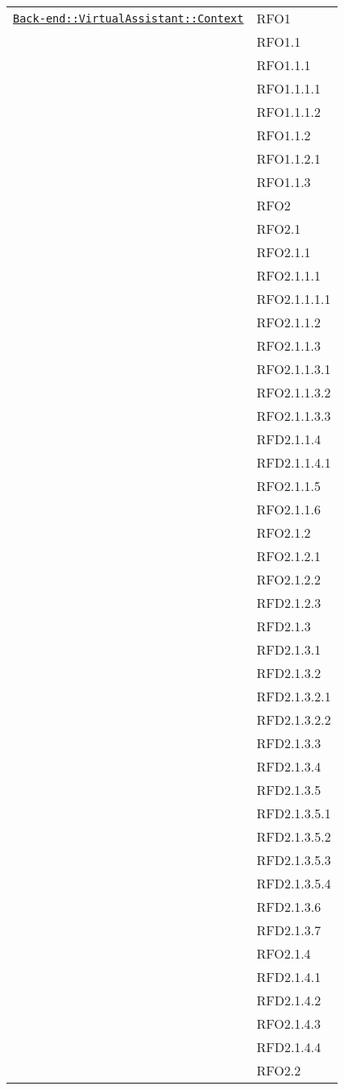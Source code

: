 \begin{longtable}{|>{\centering}m{10cm}|m{3cm}<{\centering}|}
\hyperref[Back-end::VirtualAssistant::Context]{\texttt{Back-end::VirtualAssistant::Context}} & RFO1\\
& RFO1.1\\
& RFO1.1.1\\
& RFO1.1.1.1\\
& RFO1.1.1.2\\
& RFO1.1.2\\
& RFO1.1.2.1\\
& RFO1.1.3\\
& RFO2\\
& RFO2.1\\
& RFO2.1.1\\
& RFO2.1.1.1\\
& RFO2.1.1.1.1\\
& RFO2.1.1.2\\
& RFO2.1.1.3\\
& RFO2.1.1.3.1\\
& RFO2.1.1.3.2\\
& RFO2.1.1.3.3\\
& RFD2.1.1.4\\
& RFD2.1.1.4.1\\
& RFO2.1.1.5\\
& RFO2.1.1.6\\
& RFO2.1.2\\
& RFO2.1.2.1\\
& RFO2.1.2.2\\
& RFD2.1.2.3\\
& RFD2.1.3\\
& RFD2.1.3.1\\
& RFD2.1.3.2\\
& RFD2.1.3.2.1\\
& RFD2.1.3.2.2\\
& RFD2.1.3.3\\
& RFD2.1.3.4\\
& RFD2.1.3.5\\
& RFD2.1.3.5.1\\
& RFD2.1.3.5.2\\
& RFD2.1.3.5.3\\
& RFD2.1.3.5.4\\
& RFD2.1.3.6\\
& RFD2.1.3.7\\
& RFO2.1.4\\
& RFD2.1.4.1\\
& RFD2.1.4.2\\
& RFO2.1.4.3\\
& RFD2.1.4.4\\
& RFO2.2\\

\end{longtable}
